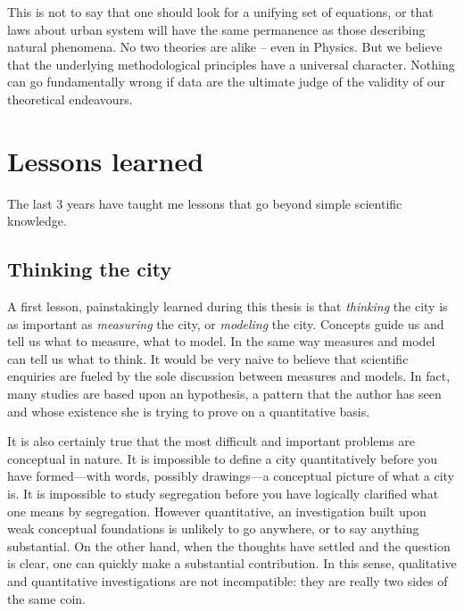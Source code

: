 This is not to say that one should look for a unifying set of equations, or that
laws about urban system will have the same permanence as those describing
natural phenomena. No two theories are alike -- even in Physics. But we believe
that the underlying methodological principles have a universal character.
Nothing can go fundamentally wrong if data are the ultimate judge of the
validity of our theoretical endeavours.



\section{Lessons learned}
\label{sec:what_the_past_3_years_have_brought}

The last $3$ years have taught me lessons that go beyond simple scientific
knowledge.

\subsection{Thinking the city}
\label{sub:thinking_the_city}

A first lesson, painstakingly learned during this thesis is that \emph{thinking} the
city is as important as \emph{measuring} the city, or \emph{modeling} the city.
Concepts guide us and tell us what to measure, what to model. In the same way
measures and model can tell us what to think. It would be very naive to
believe that scientific enquiries are fueled by the sole discussion between
measures and models. In fact, many studies are based upon an hypothesis, a
pattern that the author has seen and whose existence she is trying to prove on a
quantitative basis. 

It is also certainly true that the most difficult and important problems are
conceptual in nature.  It is impossible to define a city quantitatively 
before you have formed---with words, possibly drawings---a conceptual picture of
what a city is.  It is impossible to study segregation before you have logically
clarified what one means by segregation. However quantitative, an investigation
built upon weak conceptual foundations is unlikely to go anywhere, or to say
anything substantial. On the other hand, when the thoughts have settled and the
question is clear, one can quickly make a substantial contribution. In this
sense, qualitative and quantitative investigations are not incompatible: they
are really two sides of the same coin.\\


